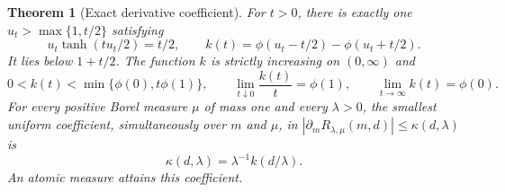 \documentclass[11pt]{article}
\newtheorem{theorem}{Theorem}
\begin{document}
\begin{theorem}[Exact derivative coefficient]
\label{thm:sharp-common-derivative}
For $t>0$, there is exactly one $u_t>\max\{1,t/2\}$ satisfying
\begin{equation}
 u_t\tanh(tu_t/2)=t/2,
 \qquad
 k(t)=\phi(u_t-t/2)-\phi(u_t+t/2).
 \label{eq:sharp-k-root}
\end{equation}
It lies below $1+t/2$. The function $k$ is strictly increasing on
$(0,\infty)$ and
\begin{equation}
 0<k(t)<\min\{\phi(0),t\phi(1)\},\qquad
 \lim_{t\downarrow0}\frac{k(t)}{t}=\phi(1),\qquad
 \lim_{t\to\infty}k(t)=\phi(0).
 \label{eq:sharp-k-properties}
\end{equation}
For every positive Borel measure $\mu$ of mass one and every $\lambda>0$,
the smallest uniform coefficient, simultaneously over $m$ and $\mu$, in
$|\partial_m R_{\lambda,\mu}(m,d)|\leq\kappa(d,\lambda)$ is
\begin{equation}
 \kappa(d,\lambda)=\lambda^{-1}k(d/\lambda).
 \label{eq:sharp-common-coefficient}
\end{equation}
An atomic measure attains this coefficient.
\end{theorem}
\end{document}

